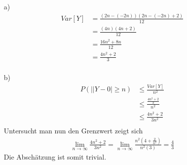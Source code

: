 \begin{enumerate}
	\item[a)]
		\begin{equation*}
			\begin{split}
				Var[Y] 	&= \frac{(2n - (-2n))(2n-(-2n)+2)}{12}\\
						&= \frac{(4n)(4n + 2)}{12}\\
						&= \frac{16n^2 + 8n}{12}\\
						&= \frac{4n^2+2}{3}\\
			\end{split}
		\end{equation*}
	\item[b)] 
		\begin{equation*}
			\begin{split}
				P(||Y-0|\ge n) 	&\leq \frac{Var[Y]}{n^2}\\
								&\leq \frac{\frac{4n^2+2}{3}}{n^2}\\
								&\leq \frac{4n^2+2}{3 n^2}\\
			\end{split}
		\end{equation*}
		Untersucht man nun den Grenzwert zeigt sich
		\begin{equation*}
			\begin{split}
				\lim\limits_{n \rightarrow \infty} \frac{4n^2+2}{3n^2} = \lim\limits_{n \rightarrow \infty} \frac{n^2(4+\frac{2}{n^2})}{n^2(3)} = \frac{4}{3}
			\end{split}
		\end{equation*}
		Die Abschätzung ist somit trivial.
\end{enumerate}